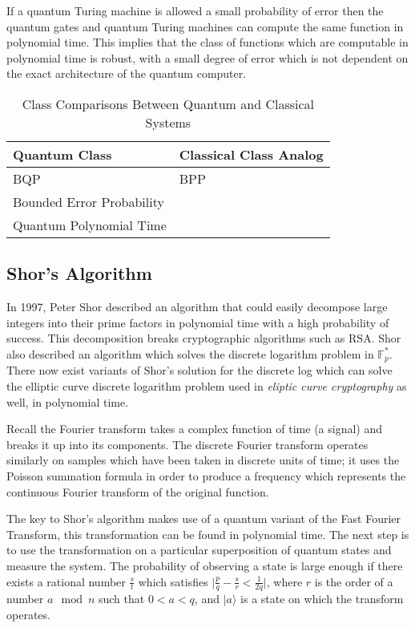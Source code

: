 \begin{nt}
    If a quantum Turing machine is allowed a small probability of error then the quantum gates and quantum Turing machines can compute the same function in polynomial time. 
    This implies that the class of functions which are computable in polynomial time is robust, with a small degree of error which is not dependent on the exact architecture of the quantum computer.
\end{nt}


\begin{table}
\begin{center}
\begin{tabularx}{250pt}{|X|X|} \hline
    \textbf{Quantum Class} & \textbf{Classical Class Analog} \\ \hline
    BQP & BPP \\ \hline
    Bounded Error Probability & \\ \hline
    Quantum Polynomial Time & \\ \hline
\end{tabularx}
\caption{Class Comparisons Between Quantum and Classical Systems}
\label{tbl: classicvsquantaclass}
\end{center}
\end{table}



\subsection{Shor's Algorithm}

In 1997, Peter Shor described an algorithm that could easily decompose large integers into their prime factors in polynomial time with a high probability of success. This decomposition breaks cryptographic algorithms such as RSA. Shor also described an algorithm which solves the discrete logarithm problem in $\mathbb{F}_{p}^{\ast}$. There now exist variants of Shor's solution for the discrete log which can solve the elliptic curve discrete logarithm problem used in \emph{eliptic curve cryptography} as well, in polynomial time. 


Recall the Fourier transform takes a complex function of time (a signal) and breaks it up into its components. The discrete Fourier transform operates similarly on samples which have been taken in discrete units of time; it uses the Poisson summation formula in order to produce a frequency which represents the continuous Fourier transform of the original function.


The key to Shor's algorithm makes use of a quantum variant of the Fast Fourier Transform, this transformation can be found in polynomial time. The next step is to use the transformation on a particular superposition of quantum states and measure the system. The probability of observing a state is large enough if there exists a rational number $\frac{s}{t}$ which satisfies $\bigg \vert \frac{p}{q} - \frac{s}{r} < \frac{1}{2q} \bigg \vert$, where $r$ is the order of a number $a \mod{n}$ such that $0 < a < q$, and $| a \rangle$ is a state on which the transform operates. 


